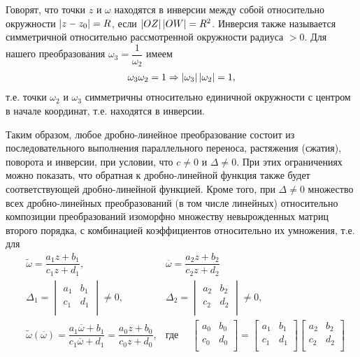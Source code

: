Говорят, что точки $z$ и $\omega$ находятся в инверсии между собой относительно окружности
$\left\lvert z - z_0 \right\rvert = R$, если $\left\lvert OZ \right\rvert\left\lvert OW \right\rvert = R^2$. Инверсия также называется симметричной
относительно рассмотренной окружности радиуса $ > 0$. Для нашего преобразования
$\omega_3 = \dfrac{1}{\omega_2}$ имеем
\begin{align*}
  \omega_3\omega_2 = 1 \Rightarrow \left\lvert \omega_3 \right\rvert\left\lvert \omega_2 \right\rvert = 1,
\end{align*}
т.е. точки $\omega_2$ и $\omega_3$ симметричны относительно единичной окружности с центром в начале
координат, т.е. находятся в инверсии.

Таким образом, любое дробно-линейное преобразование состоит из последовательного выполнения
параллельного переноса, растяжения (сжатия), поворота и инверсии, при условии, что $c \neq 0$ и
$\Delta \neq 0$. При этих ограничениях можно показать, что обратная к дробно-линейной функция
также будет соответствующей дробно-линейной функцией. Кроме того, при $\Delta \neq 0$ множество
всех дробно-линейных преобразований (в том числе линейных) относительно композиции преобразований
изоморфно множеству невырожденных матриц второго порядка, с комбинацией коэффициентов относительно
их умножения, т.е. для
\begin{align*}
  &\widetilde{\omega} = \dfrac{a_1z + b_1}{c_1z + d_1},
  &\overline{\omega} = \dfrac{a_2z + b_2}{c_2z + d_2}\\
  &\Delta_1 =
  \begin{vmatrix}
    a_1 & b_1\\
    c_1 & d_1\\
  \end{vmatrix} \neq 0,
  &\Delta_2 =
  \begin{vmatrix}
    a_2 & b_2\\
    c_2 & d_2\\
  \end{vmatrix} \neq 0,\\
  &\widetilde{\omega}(\overline{\omega}) = \dfrac{a_1\overline{\omega} + b_1}
                {c_1\overline{\omega} + d_1} = \dfrac{a_0z + b_0}{c_0z + d_0}, &\text{где }\quad
                \begin{bmatrix}
                   a_0 & b_0\\
                   c_0 & d_0\\
                 \end{bmatrix} =
                \begin{bmatrix}
                  a_1 & b_1\\
                  c_1 & d_1\\
                \end{bmatrix}
                \begin{bmatrix}
                  a_2 & b_2\\
                  c_2 & d_2\\
                \end{bmatrix}
\end{align*}

